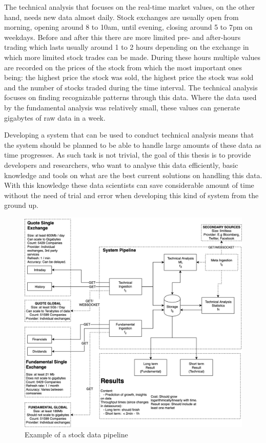 The technical analysis that focuses on the real-time market values, on the other hand, needs new data almost daily.
Stock exchanges are usually open from morning, opening around 8 to 10am, until evening, closing around 5 to 7pm on weekdays.
Before and after this there are more limited pre- and after-hours trading which lasts usually around 1 to 2 hours depending on the exchange in which more limited stock trades can be made.
During these hours multiple values are recorded on the prices of the stock from which the most important ones being: the highest price the stock was sold, the highest price the stock was sold and the number of stocks traded during the time interval.
The technical analysis focuses on finding recognizable patterns through this data. \cite{murphy}
Where the data used by the fundamental analysis was relatively small, these values can generate gigabytes of raw data in a week.

Developing a system that can be used to conduct technical analysis means that the system should be planned to be able to handle large amounts of these data as time progresses.
As such task is not trivial, the goal of this thesis is to provide developers and researchers, who want to analyse this data efficiently, basic knowledge and tools on what are the best current solutions on handling this data.
With this knowledge these data scientists can save considerable amount of time without the need of trial and error when developing this kind of system from the ground up.

\begin{figure}[ht]
    \includegraphics[scale=0.26]{images/system2} 
    \centering
    \caption{Example of a stock data pipeline}
\end{figure}

